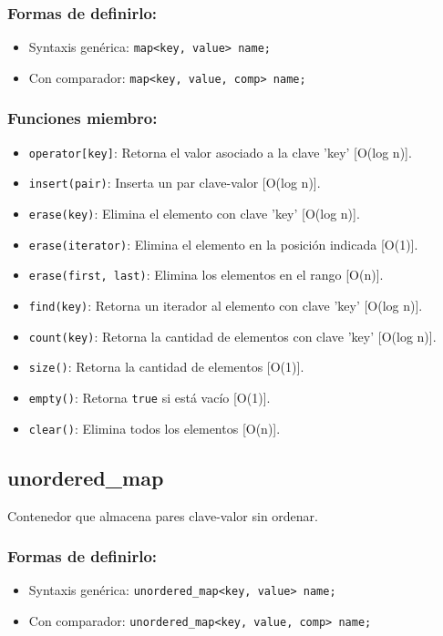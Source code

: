 \subsubsection{Formas de definirlo:}
\begin{itemize}
  \item Syntaxis genérica: \texttt{map<key, value> name;}
  \item Con comparador: \texttt{map<key, value, comp> name;}
\end{itemize}

\subsubsection{Funciones miembro:}
\begin{itemize}
  \item \texttt{operator[key]}: Retorna el valor asociado a la clave 'key' [O(log n)].
  \item \texttt{insert(pair)}: Inserta un par clave-valor [O(log n)]. 
  \item \texttt{erase(key)}: Elimina el elemento con clave 'key' [O(log n)].
  \item \texttt{erase(iterator)}: Elimina el elemento en la posición indicada [O(1)].
  \item \texttt{erase(first, last)}: Elimina los elementos en el rango [O(n)].
  \item \texttt{find(key)}: Retorna un iterador al elemento con clave 'key' [O(log n)]. 
  \item \texttt{count(key)}: Retorna la cantidad de elementos con clave 'key' [O(log n)]. 
  \item \texttt{size()}: Retorna la cantidad de elementos [O(1)]. 
  \item \texttt{empty()}: Retorna \texttt{true} si está vacío [O(1)]. 
  \item \texttt{clear()}: Elimina todos los elementos [O(n)]. 
\end{itemize}

\subsection{unordered\_map}
\label{subsec:std_unordered_map}
Contenedor que almacena pares clave-valor sin ordenar. 

\subsubsection{Formas de definirlo:}
\begin{itemize}
  \item Syntaxis genérica: \texttt{unordered\_map<key, value> name;}
  \item Con comparador: \texttt{unordered\_map<key, value, comp> name;}
\end{itemize}

